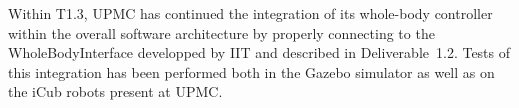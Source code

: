 

Within T1.3, UPMC has continued the integration of its whole-body controller within the overall software architecture by properly connecting to the WholeBodyInterface developped by IIT and described in Deliverable~1.2. Tests of this integration has been performed both in the Gazebo simulator as well as on the iCub robots present at UPMC. 

